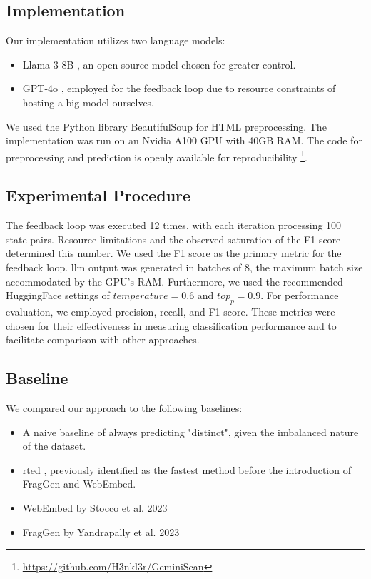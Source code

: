     \subsection{Implementation}
        \label{sec:eval:sub:impl}

        Our implementation utilizes two language models:

        \begin{itemize}
            \item Llama 3 8B \cite{touvron_llama_2023}, an open-source model chosen for greater control.
            \item GPT-4o \cite{noauthor_gpt-4o_nodate}, employed for the feedback loop due to resource constraints of hosting a big model ourselves.
        \end{itemize}
        
        We used the Python library BeautifulSoup for HTML preprocessing. The implementation was run on an Nvidia A100 GPU with 40GB RAM. The code for preprocessing and prediction is openly available for reproducibility \footnote{\url{https://github.com/H3nkl3r/GeminiScan}}.
    
    \subsection{Experimental Procedure}
        \label{sec:eval:sub:proc}
    
        The feedback loop was executed 12 times, with each iteration processing 100 state pairs. Resource limitations and the observed saturation of the F1 score determined this number. We used the F1 score as the primary metric for the feedback loop.
        \ac{llm} output was generated in batches of 8, the maximum batch size accommodated by the GPU's RAM. Furthermore, we used the recommended HuggingFace settings of $temperature=0.6$ and $top_p=0.9$.
        For performance evaluation, we employed precision, recall, and F1-score. These metrics were chosen for their effectiveness in measuring classification performance and to facilitate comparison with other approaches.
    
    \subsection{Baseline}
        \label{sec:eval:sub:base}
    
        We compared our approach to the following baselines:

        \begin{itemize}
            \item A naive baseline of always predicting "distinct", given the imbalanced nature of the dataset.
            \item \ac{rted} \cite{pawlik_efficient_2015}, previously identified as the fastest method before the introduction of FragGen and WebEmbed.
            \item WebEmbed by Stocco et al. 2023 \cite{stocco_neural_2023}
            \item FragGen by Yandrapally et al. 2023 \cite{yandrapally_fragment-based_2023}
        \end{itemize}


